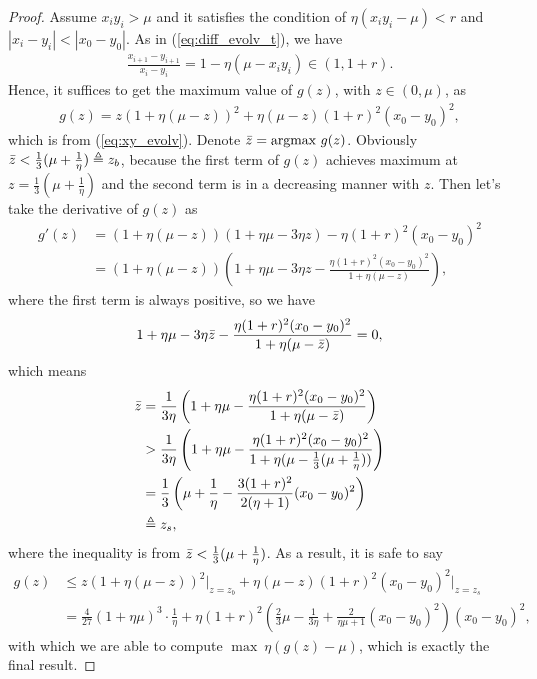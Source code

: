 \documentclass{article}
\theoremstyle{plain}
\theoremstyle{remark}
\begin{document}
\begin{proof}
Assume $x_i y_i>\mu$ and it satisfies the condition of $\eta(x_i y_i-\mu)<r$ and $|x_i-y_i|<|x_0-y_0|$. As in (\ref{eq:diff_evolv_t}), we have
\begin{align}
    \frac{x_{i+1}-y_{i+1}}{x_i-y_i}= 1-\eta\left(\mu-x_i y_i\right)\in(1,1+r).
\end{align}
Hence, it suffices to get the maximum value of $g(z)$, with $z\in(0,\mu)$, as
\begin{align}
    g(z)=z\left(1+\eta(\mu-z)\right)^2+\eta(\mu-z) (1+r)^2 (x_0-y_0)^2,
\end{align}
which is from (\ref{eq:xy_evolv}). Denote $\Bar{z}=\text{argmax}~g(z)$. Obviously $\Bar{z}<\frac{1}{3}(\mu+\frac{1}{\eta})\triangleq z_b$, because the first term of $g(z)$ achieves maximum at $z=\frac{1}{3}(\mu+\frac{1}{\eta})$ and the second term is in a decreasing manner with $z$. Then let's take the derivative of $g(z)$ as
\begin{align}
    g'(z) &=\left(1+\eta(\mu-z)\right)\left(1+\eta\mu-3\eta z\right)-\eta (1+r)^2 (x_0-y_0)^2 \nonumber \\
    &= \left(1+\eta(\mu-z)\right)\left(1+\eta\mu-3\eta z-\frac{\eta (1+r)^2 (x_0-y_0)^2 }{1+\eta(\mu-z)}\right) \nonumber,
\end{align}
where the first term is always positive, so we have
\begin{gather}
    1+\eta\mu-3\eta \Bar{z}-\frac{\eta (1+r)^2 (x_0-y_0)^2 }{1+\eta(\mu-\Bar{z})}=0,
\end{gather}
which means
\begin{align}
    \Bar{z} &= \frac{1}{3\eta}\left(1+\eta\mu-\frac{\eta (1+r)^2 (x_0-y_0)^2 }{1+\eta(\mu-\Bar{z})}\right) \\
    &>  \frac{1}{3\eta}\left(1+\eta\mu-\frac{\eta (1+r)^2 (x_0-y_0)^2 }{1+\eta(\mu-\frac{1}{3}(\mu+\frac{1}{\eta}))}\right) \\
    &= \frac{1}{3}\left(\mu+\frac{1}{\eta}-\frac{3(1+r)^2}{2(\eta+1)} (x_0-y_0)^2\right)\\
    &\triangleq z_s,
\end{align}
where the inequality is from $\Bar{z}<\frac{1}{3}(\mu+\frac{1}{\eta})$. As a result, it is safe to say
\begin{align}
    g(z) &\le z\left(1+\eta(\mu-z)\right)^2\bigg|_{z=z_b}+\eta(\mu-z) (1+r)^2 (x_0-y_0)^2\bigg|_{z=z_s} \\
    &=\frac{4}{27}(1+\eta\mu)^3\cdot\frac{1}{\eta} + \eta (1+r)^2\left(\frac{2}{3}\mu-\frac{1}{3\eta}+\frac{2}{\eta\mu+1}(x_0-y_0)^2\right)(x_0-y_0)^2,
\end{align}
with which we are able to compute $\max~\eta(g(z)-\mu)$, which is exactly the final result.
\end{proof}%
\end{document}
